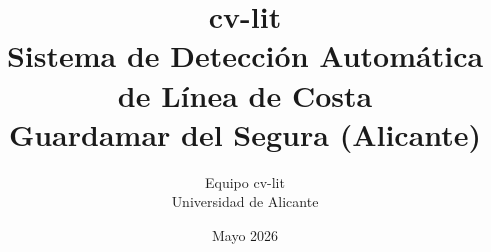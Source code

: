 



\frontmatter

\title{%
  \textbf{cv-lit}\\[0.4em]
  \large Sistema de Detección Automática de Línea de Costa\\[0.2em]
  \normalsize Guardamar del Segura (Alicante)
}
\author{Equipo cv-lit \\ Universidad de Alicante}
\date{Mayo 2026}
\maketitle

\tableofcontents

\mainmatter











\backmatter


